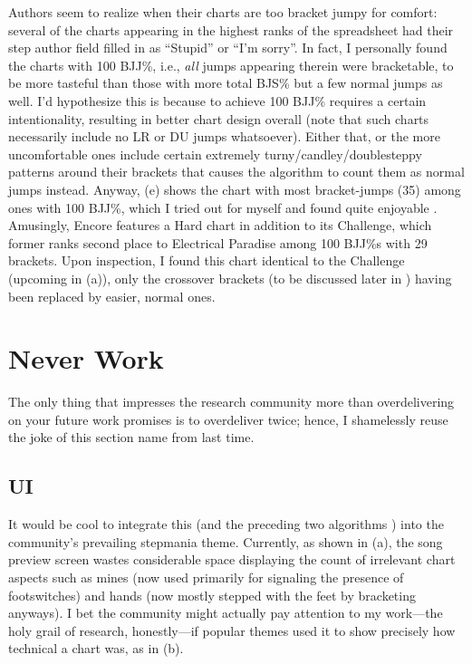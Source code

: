 \documentclass[10pt]{sigplanconf}
\begin{document}
Authors seem to realize when their charts are too bracket jumpy for comfort:
several of the charts appearing in the highest ranks of the spreadsheet had their step author field filled in as ``Stupid'' or ``I'm sorry''.
In fact, I personally found the charts with 100 BJJ\%, i.e., \textit{all} jumps appearing therein were bracketable,
to be more tasteful than those with more total BJS\% but a few normal jumps as well.
I'd hypothesize this is because to achieve 100 BJJ\% requires a certain intentionality,
resulting in better chart design overall
(note that such charts necessarily include no LR or DU jumps whatsoever).
Either that, or the more uncomfortable ones include certain extremely turny/candley/doublesteppy patterns
around their brackets that causes the algorithm to count them as normal jumps instead.
Anyway, (e) shows the chart with most bracket-jumps (35) among ones with 100 BJJ\%,
which I tried out for myself and found quite enjoyable \cite{e-paradise}.
Amusingly, Encore \cite{encore}
features a Hard chart in addition to its Challenge,
which former ranks second place to Electrical Paradise among 100 BJJ\%s with 29 brackets.
Upon inspection, I found this chart identical to the Challenge (upcoming in (a)),
only the crossover brackets
(to be discussed later in )
having been replaced by easier, normal ones.

\section{Never Work}

The only thing that impresses the research community more than overdelivering on your future work promises
is to overdeliver twice; hence, I shamelessly reuse the joke of this section name from last time.

\subsection{UI}

It would be cool to integrate this (and the preceding two algorithms \cite{turniness,crossoveriness})
into
the community's prevailing stepmania theme.
Currently, as shown in (a),
the song preview screen wastes considerable space displaying the count of irrelevant chart aspects
such as mines (now used primarily for signaling the presence of footswitches)
and hands (now mostly stepped with the feet by bracketing anyways).
I bet the community might actually pay attention to my work---the holy grail of research, honestly---if
popular themes used it to show precisely how technical a chart was, as in (b).
\end{document}
